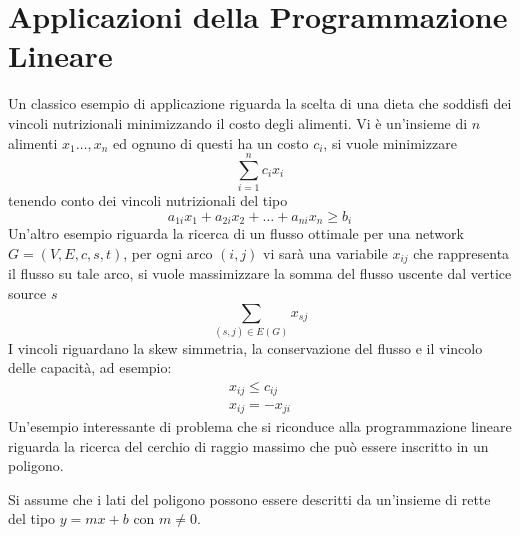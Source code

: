 \documentclass[10pt, letterpaper]{report}
\begin{document}
\section{Applicazioni della Programmazione Lineare}
Un classico esempio di applicazione riguarda la scelta di una dieta che soddisfi dei vincoli nutrizionali minimizzando il costo degli alimenti. Vi è un'insieme di $n$ alimenti $x_1\dots,x_n$ ed ognuno di questi ha un costo $c_i$, si vuole minimizzare 
$$\sum_{i=1}^nc_ix_i $$
tenendo conto dei vincoli nutrizionali del tipo 
$$ a_{1i}x_1+a_{2i}x_2+\dots + a_{ni}x_n\ge b_i$$
Un'altro esempio riguarda la ricerca di un flusso ottimale per una network $G=(V,E,c,s,t)$, per ogni arco $(i,j)$ vi sarà una variabile $x_{ij}$ che rappresenta il flusso su tale arco, si vuole massimizzare la somma del flusso uscente dal vertice source  $s$
$$ \sum_{(s,j)\in E(G)}x_{sj}$$
I vincoli riguardano la skew simmetria, la conservazione del flusso e il vincolo delle capacità, ad esempio:
$$ \begin{matrix}
    x_{ij}\le c_{ij} \\ 
    x_{ij}=-x_{ji}
\end{matrix}$$
Un'esempio interessante di problema che si riconduce alla programmazione lineare riguarda la ricerca del cerchio di raggio massimo che può essere inscritto in un poligono.
\begin{figure}[h]
\end{figure}
Si assume che i lati del poligono possono essere descritti da un'insieme di rette del tipo $y=mx+b$ con $m\ne 0$.\bigskip 
\end{document}
